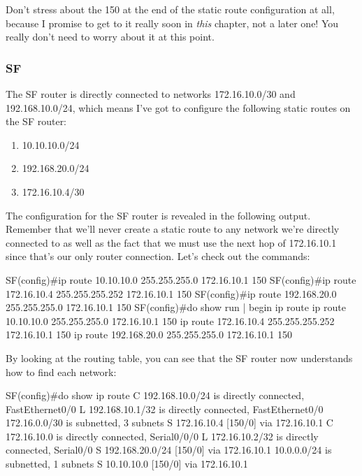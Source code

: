 \begin{note}
Don't stress about the 150 at the end of the static route configuration at all, because I promise to get to it really soon in \emph{this} chapter, not a later one!
You really don't need to worry about it at this point.
\end{note}

\subsubsection{SF}

The SF router is directly connected to networks 172.16.10.0/30 and 192.168.10.0/24, which means I've got to configure the following static routes on the SF router:

\begin{enumerate}
\item
  10.10.10.0/24
\item
  192.168.20.0/24
\item
  172.16.10.4/30
\end{enumerate}

The configuration for the SF router is revealed in the following output.
Remember that we'll never create a static route to any network we're
directly connected to as well as the fact that we must use the next hop
of 172.16.10.1 since that's our only router connection. Let's check out
the commands:

\begin{cli}
SF(config)#ip route 10.10.10.0 255.255.255.0 172.16.10.1 150
SF(config)#ip route 172.16.10.4 255.255.255.252 172.16.10.1 150
SF(config)#ip route 192.168.20.0 255.255.255.0 172.16.10.1 150
SF(config)#do show run | begin ip route
ip route 10.10.10.0 255.255.255.0 172.16.10.1 150
ip route 172.16.10.4 255.255.255.252 172.16.10.1 150
ip route 192.168.20.0 255.255.255.0 172.16.10.1 150
\end{cli}

By looking at the routing table, you can see that the SF router now
understands how to find each network:

\begin{cli}
SF(config)#do show ip route
C    192.168.10.0/24 is directly connected, FastEthernet0/0
L    192.168.10.1/32 is directly connected, FastEthernet0/0
     172.16.0.0/30 is subnetted, 3 subnets
S       172.16.10.4 [150/0] via 172.16.10.1
C       172.16.10.0 is directly connected, Serial0/0/0
L       172.16.10.2/32 is directly connected, Serial0/0
S    192.168.20.0/24 [150/0] via 172.16.10.1
     10.0.0.0/24 is subnetted, 1 subnets
S       10.10.10.0 [150/0] via 172.16.10.1
\end{cli}

